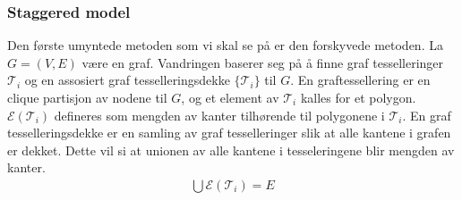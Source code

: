     \subsubsection*{Staggered model} %

        Den første umyntede metoden som vi skal se på er den forskyvede metoden. La $G=(V,E)$ være en graf. Vandringen baserer seg på å finne graf tesselleringer $\mathcal{T}_i$ og en assosiert graf tesselleringsdekke $\{\mathcal{T}_i\}$ til $G$. En graftessellering er en clique partisjon av nodene til $G$, og et element av $\mathcal{T}_i$ kalles for et polygon. $\mathcal{E}(\mathcal{T}_i)$ defineres som mengden av kanter tilhørende til polygonene i $\mathcal{T}_i$. En graf tesselleringsdekke er en samling av graf tesselleringer slik at alle kantene i grafen er dekket. Dette vil si at unionen av alle kantene i tesseleringene blir mengden av kanter.
        \begin{align*}
            \bigcup\mathcal{E}(\mathcal{T}_i) = E
        \end{align*}

